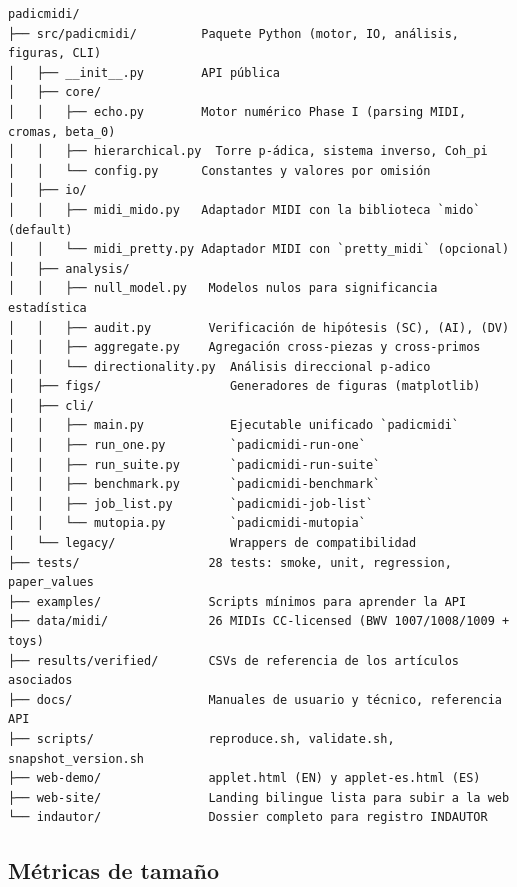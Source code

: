 \documentclass[11pt,a4paper,oneside]{article}
\theoremstyle{plain}
\theoremstyle{definition}
\theoremstyle{remark}
\begin{document}
\begin{lstlisting}[style=plain]
padicmidi/
├── src/padicmidi/         Paquete Python (motor, IO, análisis, figuras, CLI)
│   ├── __init__.py        API pública
│   ├── core/
│   │   ├── echo.py        Motor numérico Phase I (parsing MIDI, cromas, beta_0)
│   │   ├── hierarchical.py  Torre p-ádica, sistema inverso, Coh_pi
│   │   └── config.py      Constantes y valores por omisión
│   ├── io/
│   │   ├── midi_mido.py   Adaptador MIDI con la biblioteca `mido` (default)
│   │   └── midi_pretty.py Adaptador MIDI con `pretty_midi` (opcional)
│   ├── analysis/
│   │   ├── null_model.py   Modelos nulos para significancia estadística
│   │   ├── audit.py        Verificación de hipótesis (SC), (AI), (DV)
│   │   ├── aggregate.py    Agregación cross-piezas y cross-primos
│   │   └── directionality.py  Análisis direccional p-adico
│   ├── figs/                  Generadores de figuras (matplotlib)
│   ├── cli/
│   │   ├── main.py            Ejecutable unificado `padicmidi`
│   │   ├── run_one.py         `padicmidi-run-one`
│   │   ├── run_suite.py       `padicmidi-run-suite`
│   │   ├── benchmark.py       `padicmidi-benchmark`
│   │   ├── job_list.py        `padicmidi-job-list`
│   │   └── mutopia.py         `padicmidi-mutopia`
│   └── legacy/                Wrappers de compatibilidad
├── tests/                  28 tests: smoke, unit, regression, paper_values
├── examples/               Scripts mínimos para aprender la API
├── data/midi/              26 MIDIs CC-licensed (BWV 1007/1008/1009 + toys)
├── results/verified/       CSVs de referencia de los artículos asociados
├── docs/                   Manuales de usuario y técnico, referencia API
├── scripts/                reproduce.sh, validate.sh, snapshot_version.sh
├── web-demo/               applet.html (EN) y applet-es.html (ES)
├── web-site/               Landing bilingue lista para subir a la web
└── indautor/               Dossier completo para registro INDAUTOR
\end{lstlisting}

\subsection{Métricas de tamaño}
\end{document}
